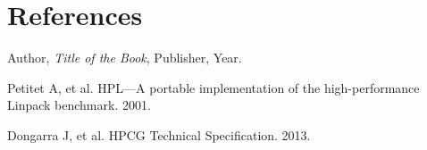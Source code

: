 \documentclass[a4paper,12pt]{article}
\begin{document}
\newpage

\section{References}
\begin{thebibliography}{9}
Author, \textit{Title of the Book}, Publisher, Year.

Petitet A, et al. HPL—A portable implementation of the high-performance Linpack benchmark. 2001.

Dongarra J, et al. HPCG Technical Specification. 2013.
\end{thebibliography}

\newpage
\end{document}
